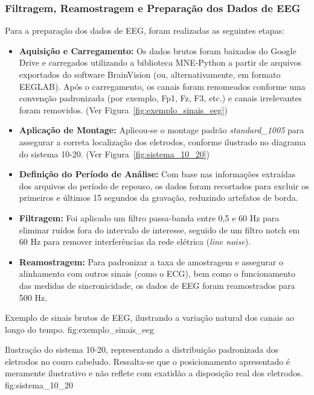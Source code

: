 \subsubsection{Filtragem, Reamostragem e Preparação dos Dados de EEG}
Para a preparação dos dados de EEG, foram realizadas as seguintes etapas:
\begin{itemize}
    \item \textbf{Aquisição e Carregamento:} Os dados brutos foram baixados do Google Drive e carregados utilizando a biblioteca MNE-Python a partir de arquivos exportados do software BrainVision (ou, alternativamente, em formato EEGLAB). Após o carregamento, os canais foram renomeados conforme uma convenção padronizada (por exemplo, Fp1, Fz, F3, etc.) e canais irrelevantes foram removidos. (Ver Figura~\ref{fig:exemplo_sinais_eeg})
    \item \textbf{Aplicação de Montage:} Aplicou-se o montage padrão \textit{standard\_1005} para assegurar a correta localização dos eletrodos, conforme ilustrado no diagrama do sistema 10-20. (Ver Figura~\ref{fig:sistema_10_20})
    \item \textbf{Definição do Período de Análise:} Com base nas informações extraídas dos arquivos do período de repouso, os dados foram recortados para excluir os primeiros e últimos 15 segundos da gravação, reduzindo artefatos de borda.
    \item \textbf{Filtragem:} Foi aplicado um filtro passa-banda entre 0,5 e 60 Hz para eliminar ruídos fora do intervalo de interesse, seguido de um filtro notch em 60 Hz para remover interferências da rede elétrica (\textit{line noise}).
    \item \textbf{Reamostragem:} Para padronizar a taxa de amostragem e assegurar o alinhamento com outros sinais (como o ECG), bem como o funcionamento das medidas de sincronicidade, os dados de EEG foram reamostrados para 500 Hz.
\end{itemize}

{Exemplo de sinais brutos de EEG, ilustrando a variação natural dos canais ao longo do tempo.}
{fig:exemplo_sinais_eeg}

{Ilustração do sistema 10-20, representando a distribuição padronizada dos eletrodos no couro cabeludo. Ressalta-se que o posicionamento apresentado é meramente ilustrativo e não reflete com exatidão a disposição real dos eletrodos.}
{fig:sistema_10_20}



